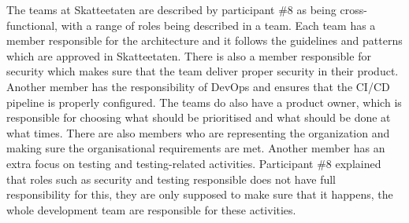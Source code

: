 The teams at Skatteetaten are described by participant \#8 as being cross-functional, with a range of roles being described in a team. Each team has a member responsible for the architecture and it follows the guidelines and patterns which are approved in Skatteetaten. There is also a member responsible for security which makes sure that the team deliver proper security in their product. Another member has the responsibility of DevOps and ensures that the CI/CD pipeline is properly configured. The teams do also have a product owner, which is responsible for choosing what should be prioritised and what should be done at what times. There are also members who are representing the organization and making sure the organisational requirements are met. Another member has an extra focus on testing and testing-related activities. Participant \#8 explained that roles such as security and testing responsible does not have full responsibility for this, they are only supposed to make sure that it happens, the whole development team are responsible for these activities.



